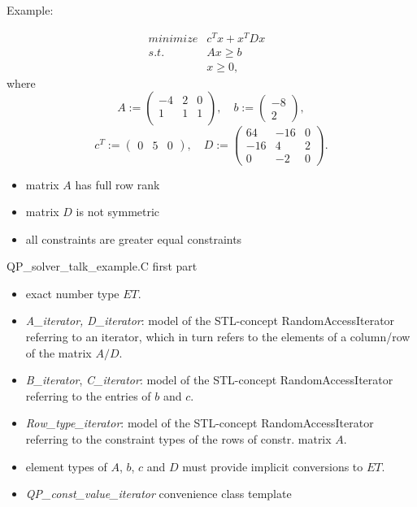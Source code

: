 \documentclass{slides}
\begin{document}
\begin{slide}
Example:

\begin{eqnarray*}
minimize & c^{T}x+x^{T}Dx & \\
s.t.     & Ax \geq b & \\
         & x \geq 0  ,&
\end{eqnarray*}
where
\[
A:=
\left(
\begin{array}{rrr}
-4 & 2 & 0 \\
1  & 1 & 1 \\
\end{array}
\right),
\quad
b:=
\left(
\begin{array}{r}
-8 \\
2
\end{array}
\right),
\]
\[
c^{T}:=
\left(
\begin{array}{rrr}
0 & 5 & 0
\end{array}
\right),
\quad
D:=
\left(
\begin{array}{rrr}
64  & -16 & 0 \\
-16 &   4 & 2 \\
0   &  -2 & 0 
\end{array}
\right).
\]
\end{slide}


\begin{note}
\begin{itemize}
\item  matrix $A$ has full row rank
\item  matrix $D$ is not symmetric
\item all constraints are greater equal constraints 
\end{itemize}
\end{note}

\begin{slide}
QP\_solver\_talk\_example.C first part
\end{slide}

\begin{note}
\begin{itemize}
\item exact number type $ET$.
\item \emph{A\_iterator, D\_iterator}: model of the STL-concept
RandomAccessIterator referring to an iterator, which in turn refers to the
elements of a column/row of the matrix $A/D$.
\item \emph{B\_iterator}, \emph{C\_iterator}: model of the STL-concept
RandomAccessIterator referring to the entries of $b$ and $c$.
\item \emph{Row\_type\_iterator}: model of the STL-concept
RandomAccessIterator referring to the constraint types of the rows of constr.
matrix $A$.  
\item element types of $A$, $b$, $c$ and $D$ must provide implicit conversions
to $ET$.
\item \emph{QP\_const\_value\_iterator} convenience class template
\end{itemize}
\end{note}
\end{document}
